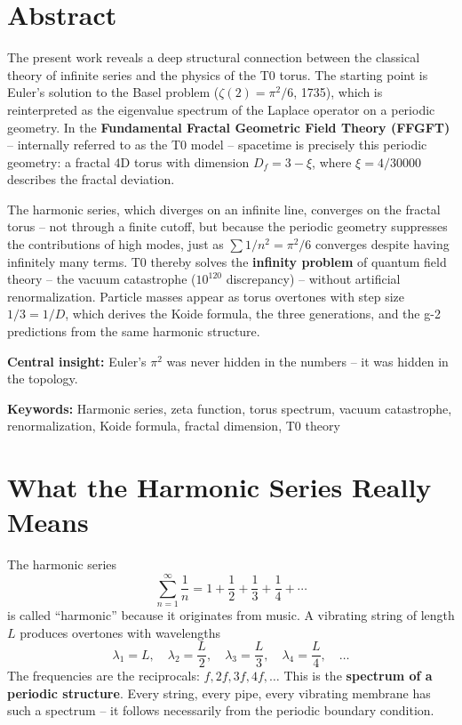 
	\section*{Abstract}
	The present work reveals a deep structural connection between the classical theory of infinite series and the physics of the T0 torus. The starting point is Euler's solution to the Basel problem ($\zeta(2) = \pi^2/6$, 1735), which is reinterpreted as the eigenvalue spectrum of the Laplace operator on a periodic geometry. In the \textbf{Fundamental Fractal Geometric Field Theory (FFGFT)} -- internally referred to as the T0 model -- spacetime is precisely this periodic geometry: a fractal 4D torus with dimension $D_f = 3 - \xi$, where $\xi = 4/30000$ describes the fractal deviation.
	
	The harmonic series, which diverges on an infinite line, converges on the fractal torus -- not through a finite cutoff, but because the periodic geometry suppresses the contributions of high modes, just as $\sum 1/n^2 = \pi^2/6$ converges despite having infinitely many terms. T0 thereby solves the \textbf{infinity problem} of quantum field theory -- the vacuum catastrophe ($10^{120}$ discrepancy) -- without artificial renormalization. Particle masses appear as torus overtones with step size $1/3 = 1/D$, which derives the Koide formula, the three generations, and the g-2 predictions from the same harmonic structure.
	
	\textbf{Central insight:} Euler's $\pi^2$ was never hidden in the numbers -- it was hidden in the topology.
	
	\textbf{Keywords:} Harmonic series, zeta function, torus spectrum, vacuum catastrophe, renormalization, Koide formula, fractal dimension, T0 theory


	\section{What the Harmonic Series Really Means}
	
	The harmonic series
	\begin{equation}
		\sum_{n=1}^{\infty} \frac{1}{n} = 1 + \frac{1}{2} + \frac{1}{3} + \frac{1}{4} + \cdots
		\label{eq:harmonic}
	\end{equation}
	is called ``harmonic'' because it originates from music. A vibrating string of length $L$ produces overtones with wavelengths
	\begin{equation}
		\lambda_1 = L, \quad \lambda_2 = \frac{L}{2}, \quad \lambda_3 = \frac{L}{3}, \quad \lambda_4 = \frac{L}{4}, \quad \ldots
	\end{equation}
	The frequencies are the reciprocals: $f, 2f, 3f, 4f, \ldots$ This is the \textbf{spectrum of a periodic structure}. Every string, every pipe, every vibrating membrane has such a spectrum -- it follows necessarily from the periodic boundary condition.
	
